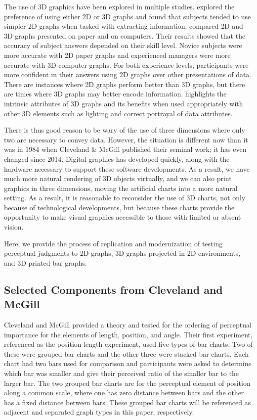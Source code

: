 \documentclass[letterpaper,inpress,dvipsnames]{jdsart}
\begin{document}
The use of 3D graphics have been explored in multiple studies.
\citet{fisher_data_1997} explored the preference of using either 2D or 3D graphs and found that subjects tended to use simpler 2D graphs when tasked with extracting information. \citet{barfield_effects_1989} compared 2D and 3D graphs presented on paper and on computers.
Their results showed that the accuracy of subject answers depended on their skill level.
Novice subjects were more accurate with 2D paper graphs and experienced managers were more accurate with 3D computer graphs.
For both experience levels, participants were more confident in their answers using 2D graphs over other presentations of data.
There are instances where 2D graphs perform better than 3D graphs, but there are times where 3D graphs may better encode information.
\citet{brath_3d_2014} highlights the intrinsic attributes of 3D graphs and its benefits when used appropriately with other 3D elements such as lighting and correct portrayal of data attributes.

There is thus good reason to be wary of the use of three dimensions where only two are necessary to convey data.
However, the situation is different now than it was in 1984 when Cleveland \& McGill published their seminal work; it has even changed since 2014.
Digital graphics has developed quickly, along with the hardware necessary to support these software developments.
As a result, we have much more natural rendering of 3D objects virtually, and we can also print graphics in three dimensions, moving the artificial charts into a more natural setting.
As a result, it is reasonable to reconsider the use of 3D charts, not only because of technological developments, but because these charts provide the opportunity to make visual graphics accessible to those with limited or absent vision.

Here, we provide the process of replication and modernization of testing perceptual judgments to 2D graphs, 3D graphs projected in 2D environments, and 3D printed bar graphs.

\hypertarget{selected-components-from-cleveland-and-mcgill}{%
\subsection{Selected Components from Cleveland and McGill}\label{selected-components-from-cleveland-and-mcgill}}

Cleveland and McGill provided a theory and tested for the ordering of perceptual importance for the elements of length, position, and angle.
Their first experiment, referenced as the position-length experiment, used five types of bar charts.
Two of these were grouped bar charts and the other three were stacked bar charts.
Each chart had two bars used for comparison and participants were asked to determine which bar was smaller and give their perceived ratio of the smaller bar to the larger bar.
The two grouped bar charts are for the perceptual element of position along a common scale, where one has zero distance between bars and the other has a fixed distance between bars.
These grouped bar charts will be referenced as adjacent and separated graph types in this paper, respectively.
\end{document}
